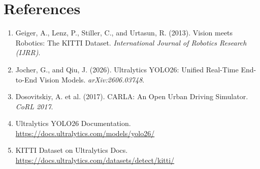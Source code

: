 \documentclass[12pt, a4paper]{article}
\begin{document}
\section*{References}

\begin{enumerate}
  \item Geiger, A., Lenz, P., Stiller, C., and Urtasun, R. (2013). Vision meets Robotics: The KITTI
        Dataset. \textit{International Journal of Robotics Research (IJRR)}.
  \item Jocher, G., and Qiu, J. (2026). Ultralytics YOLO26: Unified Real-Time End-to-End Vision
        Models. \textit{arXiv:2606.03748}.
  \item Dosovitskiy, A. et al. (2017). CARLA: An Open Urban Driving Simulator. \textit{CoRL 2017}.
  \item Ultralytics YOLO26 Documentation.
        \url{https://docs.ultralytics.com/models/yolo26/}
  \item KITTI Dataset on Ultralytics Docs.
        \url{https://docs.ultralytics.com/datasets/detect/kitti/}
\end{enumerate}
\end{document}
